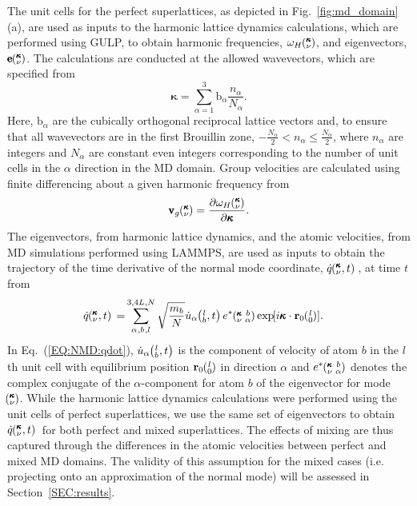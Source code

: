 \documentclass[aps,prb,preprint,preprintnumbers,amsmath,amssymb,floatfix,superscriptaddress]{revtex4}
\newcommand{\EXP}[1]{\exp\mspace{-5.0mu}\left[#1\right]\mspace{-3.0mu}}
\newcommand{\SUM}[2]{\ifthenelse{\equal{#1}{0}}{\sum_{
\alpha_{#2},b_{#2},l_{#2}}^{3,4L,N}} {\ifthenelse{\equal{#1}{1}}{\sum_{
\alpha_{#2},b_{#2}}^{3,n}}{\sum_{\pmb{\kappa}#2,\nu#2}^{N,3n}}}}
\newcommand{\ab}[2]{\mspace{-4.0mu}\left(\mspace{-8.0mu}
\begin{smallmatrix}&\ifthenelse{\equal{#1}{}}{a}{#1} \\&\ifthenelse
{\equal{#2}{}}{b}{#2}\end{smallmatrix}\mspace{-3.0mu}\right)}
\newcommand{\kvba}{\mspace{-4.0mu}\left(\mspace{-8.0mu}
\begin{smallmatrix} &\pmb{\kappa} &b \\ &\nu &\alpha\end{smallmatrix}
\mspace{-3.0mu}\right)}
\newcommand{\kvt}{\mspace{-4.0mu}\left(\mspace{-8.0mu}
\begin{smallmatrix}&\pmb{\kappa} \\&\nu\end{smallmatrix}
\mspace{-2.0mu},t\right)}
\newcommand{\kv}{\mspace{-4.0mu}\left(\mspace{-8.0mu}
\begin{smallmatrix}&\pmb{\kappa} \\&\nu\end{smallmatrix}
\mspace{-3.0mu}\right)}
\newcommand{\lbt}{\mspace{-4.0mu}\left(\mspace{-8.0mu}
\begin{smallmatrix}&l \\&b\end{smallmatrix}\mspace{-2.0mu},t\right)}
\begin{document}
The unit cells for the perfect superlattices, as depicted in Fig.~\ref{fig:md_domain}(a), are used as inputs to the harmonic lattice dynamics calculations, which are performed using GULP\cite{GULP}, to obtain harmonic frequencies, $\omega_H \kv$, and eigenvectors, $ \pmb{\mathrm{e}} \kv$. The calculations are conducted at the allowed wavevectors, which are specified from
\begin{equation}\label{EQ:NMD:allowdkpt}
\pmb{\kappa} = \sum_{\alpha=1}^3 \pmb{\mathrm{b}}_{\alpha} \frac{n_{\alpha}}{N_{\alpha}}.
\end{equation}
Here, $\pmb{\mathrm{b}}_\alpha$ are the cubically orthogonal reciprocal lattice vectors and, to ensure that all wavevectors are in the first Brouillin zone, $ -\frac{N_\alpha}{2} < n_\alpha \le \frac {N_\alpha}{2}$, where $n_\alpha$ are integers and $N_\alpha$ are constant even integers corresponding to the number of unit cells in the $\alpha$ direction in the MD domain. Group velocities are calculated using finite differencing about a given harmonic frequency from \cite{ziman_electrons_2001}
\begin{equation}\label{EQ:NMD:vg}
\begin{split}
\pmb{\mathrm{v}}_{g}\kv=\frac{\partial \omega_H \kv}{\partial \pmb{\kappa}}.
\end{split}
\end{equation}
The eigenvectors, from harmonic lattice dynamics, and the atomic velocities, from MD simulations performed using LAMMPS,\cite{LAMMPS} are used as inputs to obtain the trajectory of the time derivative of the normal mode coordinate, $\dot{q}\kvt{}{}{}$, at time $t$ from
\begin{equation}\label{EQ:NMD:qdot}
\begin{split}
\dot{q}\kvt{}{}{}=&\SUM{0}{}\sqrt{\frac{m_b}{N}}\dot{u}_{\alpha}\lbt e^*\kvba\EXP{i\pmb{\kappa}\cdot\mathbf{r}_0\ab{l}{0}}.
\end{split}
\end{equation}
In Eq.~(\ref{EQ:NMD:qdot}), $\dot{u}_{\alpha}\lbt$ is the component of velocity of atom $b$ in the $l$th unit cell with equilibrium position $\mathbf{r}_0\ab{l}{0}$ in direction $\alpha$ and $e^*\kvba$ denotes the complex conjugate of the $\alpha$-component for atom $b$ of the eigenvector for mode  ~$\kv$. While the harmonic lattice dynamics calculations were performed using the unit cells of perfect superlattices, we use the same set of eigenvectors to obtain $\dot{q}\kvt{}{}{}$ for both perfect and mixed superlattices. The effects of mixing are thus captured through the differences in the atomic velocities between perfect and mixed MD domains. The validity of this assumption for the mixed cases (i.e. projecting onto an approximation of the normal mode) will be assessed in Section~\ref{SEC:results}.
\end{document}
